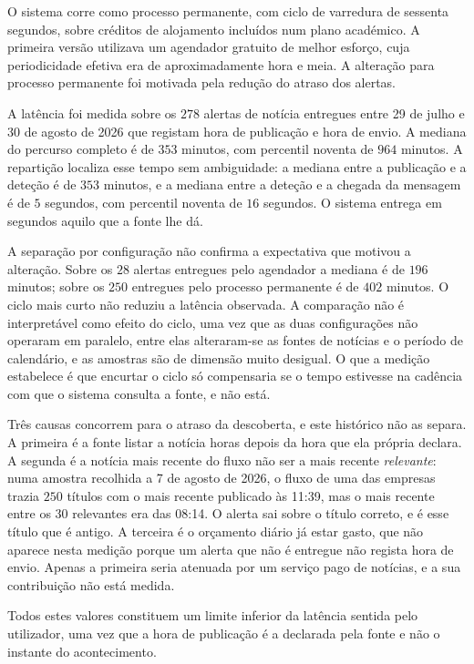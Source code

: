 O sistema corre como processo permanente, com ciclo de varredura de sessenta segundos, sobre
créditos de alojamento incluídos num plano académico. A primeira versão utilizava um agendador
gratuito de melhor esforço, cuja periodicidade efetiva era de aproximadamente hora e meia. A
alteração para processo permanente foi motivada pela redução do atraso dos alertas.

A latência foi medida sobre os $278$ alertas de notícia entregues entre 29 de julho e 30 de agosto
de 2026 que registam hora de publicação e hora de envio. A mediana do percurso completo é de $353$
minutos, com percentil noventa de $964$ minutos. A repartição localiza esse tempo sem ambiguidade:
a mediana entre a publicação e a deteção é de $353$ minutos, e a mediana entre a deteção e a
chegada da mensagem é de $5$ segundos, com percentil noventa de $16$ segundos. O sistema entrega em
segundos aquilo que a fonte lhe dá.

A separação por configuração não confirma a expectativa que motivou a alteração. Sobre os $28$
alertas entregues pelo agendador a mediana é de $196$ minutos; sobre os $250$ entregues pelo
processo permanente é de $402$ minutos. O ciclo mais curto não reduziu a latência observada. A
comparação não é interpretável como efeito do ciclo, uma vez que as duas configurações não
operaram em paralelo, entre elas alteraram-se as fontes de notícias e o período de calendário, e
as amostras são de dimensão muito desigual. O que a medição estabelece é que encurtar o ciclo só
compensaria se o tempo estivesse na cadência com que o sistema consulta a fonte, e não está.

Três causas concorrem para o atraso da descoberta, e este histórico não as separa. A primeira é a
fonte listar a notícia horas depois da hora que ela própria declara. A segunda é a notícia mais
recente do fluxo não ser a mais recente \emph{relevante}: numa amostra recolhida a 7 de agosto de
2026, o fluxo de uma das empresas trazia $250$ títulos com o mais recente publicado às 11:39, mas
o mais recente entre os $30$ relevantes era das 08:14. O alerta sai sobre o título correto, e é
esse título que é antigo. A terceira é o orçamento diário já estar gasto, que não aparece nesta
medição porque um alerta que não é entregue não regista hora de envio. Apenas a primeira seria
atenuada por um serviço pago de notícias, e a sua contribuição não está medida.

Todos estes valores constituem um limite inferior da latência sentida pelo utilizador, uma vez que
a hora de publicação é a declarada pela fonte e não o instante do acontecimento.

